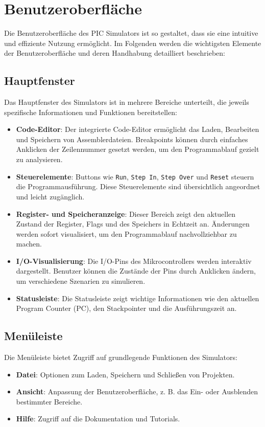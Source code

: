 \documentclass[a4paper,11pt]{report}
\begin{document}
\chapter{Benutzeroberfläche}

Die Benutzeroberfläche des PIC Simulators ist so gestaltet, dass sie eine intuitive und effiziente Nutzung ermöglicht. Im Folgenden werden die wichtigsten Elemente der Benutzeroberfläche und deren Handhabung detailliert beschrieben:

\section{Hauptfenster}
Das Hauptfenster des Simulators ist in mehrere Bereiche unterteilt, die jeweils spezifische Informationen und Funktionen bereitstellen:
\begin{itemize}
    \item \textbf{Code-Editor}: Der integrierte Code-Editor ermöglicht das Laden, Bearbeiten und Speichern von Assemblerdateien. Breakpoints können durch einfaches Anklicken der Zeilennummer gesetzt werden, um den Programmablauf gezielt zu analysieren.
    \item \textbf{Steuerelemente}: Buttons wie \texttt{Run}, \texttt{Step In}, \texttt{Step Over} und \texttt{Reset} steuern die Programmausführung. Diese Steuerelemente sind übersichtlich angeordnet und leicht zugänglich.
    \item \textbf{Register- und Speicheranzeige}: Dieser Bereich zeigt den aktuellen Zustand der Register, Flags und des Speichers in Echtzeit an. Änderungen werden sofort visualisiert, um den Programmablauf nachvollziehbar zu machen.
    \item \textbf{I/O-Visualisierung}: Die I/O-Pins des Mikrocontrollers werden interaktiv dargestellt. Benutzer können die Zustände der Pins durch Anklicken ändern, um verschiedene Szenarien zu simulieren.
    \item \textbf{Statusleiste}: Die Statusleiste zeigt wichtige Informationen wie den aktuellen Program Counter (PC), den Stackpointer und die Ausführungszeit an.
\end{itemize}

\section{Menüleiste}
Die Menüleiste bietet Zugriff auf grundlegende Funktionen des Simulators:
\begin{itemize}
    \item \textbf{Datei}: Optionen zum Laden, Speichern und Schließen von Projekten.
    \item \textbf{Ansicht}: Anpassung der Benutzeroberfläche, z. B. das Ein- oder Ausblenden bestimmter Bereiche.
    \item \textbf{Hilfe}: Zugriff auf die Dokumentation und Tutorials.
\end{itemize}
\end{document}
